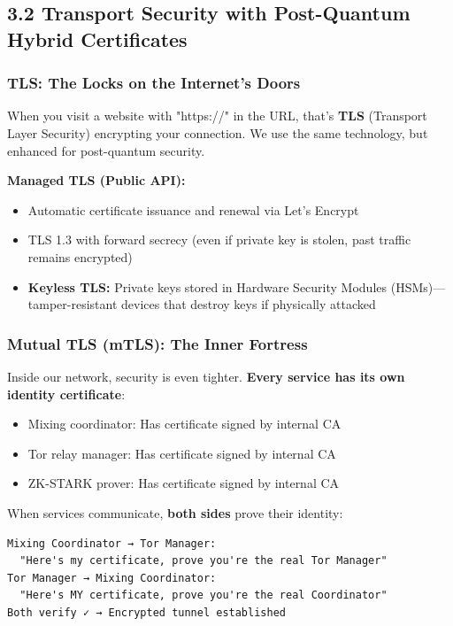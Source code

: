 \documentclass[11pt,a4paper]{article}
\begin{document}
\subsection{3.2 Transport Security with Post-Quantum Hybrid Certificates}

\subsubsection{TLS: The Locks on the Internet's Doors}

When you visit a website with "https://" in the URL, that's \textbf{TLS} (Transport Layer Security) encrypting your connection. We use the same technology, but enhanced for post-quantum security.

\textbf{Managed TLS (Public API):}
\begin{itemize}
    \item Automatic certificate issuance and renewal via Let's Encrypt
    \item TLS 1.3 with forward secrecy (even if private key is stolen, past traffic remains encrypted)
    \item \textbf{Keyless TLS:} Private keys stored in Hardware Security Modules (HSMs)—tamper-resistant devices that destroy keys if physically attacked
\end{itemize}

\subsubsection{Mutual TLS (mTLS): The Inner Fortress}

Inside our network, security is even tighter. \textbf{Every service has its own identity certificate}:
\begin{itemize}
    \item Mixing coordinator: Has certificate signed by internal CA
    \item Tor relay manager: Has certificate signed by internal CA
    \item ZK-STARK prover: Has certificate signed by internal CA
\end{itemize}

When services communicate, \textbf{both sides} prove their identity:
\begin{verbatim}
Mixing Coordinator → Tor Manager:
  "Here's my certificate, prove you're the real Tor Manager"
Tor Manager → Mixing Coordinator:
  "Here's MY certificate, prove you're the real Coordinator"
Both verify ✓ → Encrypted tunnel established
\end{verbatim}
\end{document}
